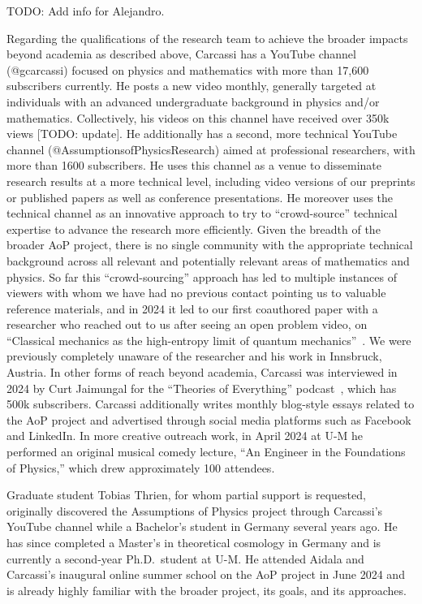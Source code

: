 TODO: Add info for Alejandro.

Regarding the qualifications of the research team to achieve the broader impacts beyond academia as described above, Carcassi has a YouTube channel (@gcarcassi) focused on physics and mathematics with more than 17,600 subscribers currently.  He posts a new video monthly, generally targeted at individuals with an advanced undergraduate background in physics and/or mathematics.  Collectively, his videos on this channel have received over 350k views [TODO: update]. He additionally has a second, more technical YouTube channel (@AssumptionsofPhysicsResearch) aimed at professional researchers, with more than 1600 subscribers.  He uses this channel as a venue to disseminate research results at a more technical level, including video versions of our preprints or published papers as well as conference presentations.  He moreover uses the technical channel as an innovative approach to try to ``crowd-source'' technical expertise to advance the research more efficiently.  Given the breadth of the broader AoP project, there is no single community with the appropriate technical background across all relevant and potentially relevant areas of mathematics and physics.  So far this ``crowd-sourcing'' approach has led to multiple instances of viewers with whom we have had no previous contact pointing us to valuable reference materials, and in 2024 it led to our first coauthored paper with a researcher who reached out to us after seeing an open problem video, on ``Classical mechanics as the high-entropy limit of quantum mechanics''~\cite{aop-classicallimit}. We were previously completely unaware of the researcher and his work in Innsbruck, Austria.  In other forms of reach beyond academia, Carcassi was interviewed in 2024 by Curt Jaimungal for the ``Theories of Everything'' podcast~\cite{Carcassi-ToEInterview}, which has 500k subscribers.  Carcassi additionally writes monthly blog-style essays related to the AoP project and advertised through social media platforms such as Facebook and LinkedIn.  In more creative outreach work, in April 2024 at U-M he performed an original musical comedy lecture, ``An Engineer in the Foundations of Physics,'' which drew approximately 100 attendees. 

Graduate student Tobias Thrien, for whom partial support is requested, originally discovered the Assumptions of Physics project through Carcassi's YouTube channel while a Bachelor's student in Germany several years ago.  He has since completed a Master's in theoretical cosmology in Germany and is currently a second-year Ph.D.~student at U-M.  He attended Aidala and Carcassi's inaugural online summer school on the AoP project in June 2024 and is already highly familiar with the broader project, its goals, and its approaches.  



